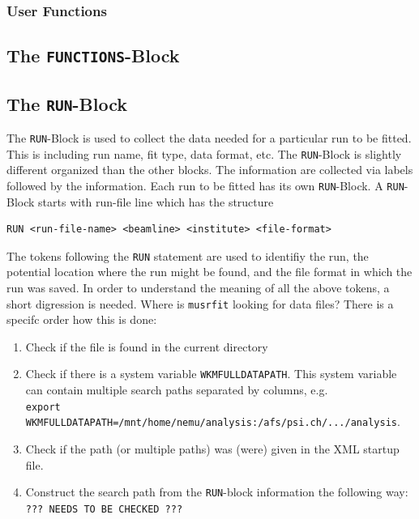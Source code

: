 \documentclass[twoside]{article}
\begin{document}
\subsubsection{User Functions}\label{subsubsec:user-functions}%

\subsection{The \texttt{FUNCTIONS}-Block}\label{subsec:msr-file-functions-block}%

\subsection{The \texttt{RUN}-Block}\label{subsec:msr-file-run-block}%

The \texttt{RUN}-Block is used to collect the data needed for a particular run to be fitted. This is including run name, fit type, data format, etc.\xspace The \texttt{RUN}-Block is slightly different organized than the other blocks. The information are collected via labels followed by the information.
Each run to be fitted has its own \texttt{RUN}-Block. A \texttt{RUN}-Block starts with run-file line which has the structure

\begin{verbatim}
RUN <run-file-name> <beamline> <institute> <file-format>
\end{verbatim}

\noindent The tokens following the \texttt{RUN} statement are used to identifiy the run, the potential location where the run might be found, and the file format in which the run was saved. In order to understand the meaning of all the above tokens, a short digression is needed. Where is \texttt{musrfit} looking for data files? There is a specifc order how this is done:

\begin{enumerate}
 \item Check if the file is found in the current directory
 \item Check if there is a system variable \texttt{WKMFULLDATAPATH}. This system variable can
       contain multiple search paths separated by columns, e.g.\xspace \\ 
       \texttt{export WKMFULLDATAPATH=/mnt/home/nemu/analysis:/afs/psi.ch/.../analysis}.
 \item Check if the path (or multiple paths) was (were) given in the XML startup file.
 \item Construct the search path from the \texttt{RUN}-block information the following way: \\
       \texttt{??? NEEDS TO BE CHECKED ???}
\end{enumerate}
\end{document}
